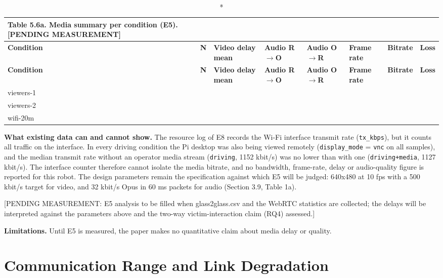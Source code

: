 \begin{center}
\footnotesize
\begin{longtable}{|l|l|l|l|l|l|l|l|}
\caption*{Table 5.6a. Media summary per condition (E5). [PENDING MEASUREMENT]}
\addcontentsline{lot}{table}{\protect\numberline{5.6a}Media summary per condition (E5). [PENDING MEASUREMENT]}
\\
\hline
\textbf{Condition} & \textbf{N} & \textbf{Video delay mean} & \textbf{Audio R$\rightarrow$O} & \textbf{Audio O$\rightarrow$R} & \textbf{Frame rate} & \textbf{Bitrate} & \textbf{Loss} \\
\hline
\endfirsthead
\hline
\textbf{Condition} & \textbf{N} & \textbf{Video delay mean} & \textbf{Audio R$\rightarrow$O} & \textbf{Audio O$\rightarrow$R} & \textbf{Frame rate} & \textbf{Bitrate} & \textbf{Loss} \\
\hline
\endhead
viewers-1 & & & & & & & \\
\hline
viewers-2 & & & & & & & \\
\hline
wifi-20m & & & & & & & \\
\hline
\end{longtable}
\end{center}

\textbf{What existing data can and cannot show.} The resource log of E8 records the Wi-Fi interface transmit rate (\texttt{tx\_kbps}), but it counts all traffic on the interface. In every driving condition the Pi desktop was also being viewed remotely (\texttt{display\_mode} = \texttt{vnc} on all samples), and the median transmit rate without an operator media stream (\texttt{driving}, 1152 kbit/s) was no lower than with one (\texttt{driving+media}, 1127 kbit/s). The interface counter therefore cannot isolate the media bitrate, and no bandwidth, frame-rate, delay or audio-quality figure is reported for this robot. The design parameters remain the specification against which E5 will be judged: 640x480 at 10 fps with a 500 kbit/s target for video, and 32 kbit/s Opus \cite{valin2012} in 60 ms packets for audio (Section 3.9, Table 1a).

[PENDING MEASUREMENT: E5 analysis to be filled when glass2glass.csv and the WebRTC statistics are collected; the delays will be interpreted against the parameters above and the two-way victim-interaction claim (RQ4) assessed.]

\textbf{Limitations.} Until E5 is measured, the paper makes no quantitative claim about media delay or quality.

\section{Communication Range and Link Degradation}

